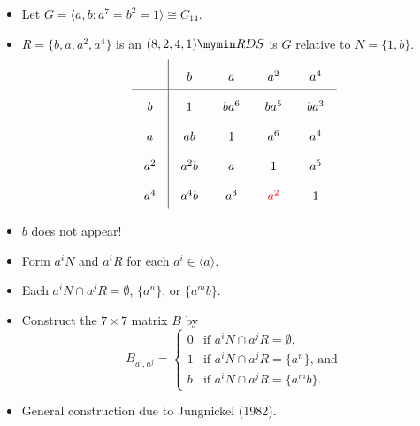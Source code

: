 \documentclass{beamer}
\newcommand{\rds}[1]{#1 \mymin RDS}
\newcommand{\RR}[1]{\textcolor{red}{#1}}
\begin{document}
\begin{frame}

  \begin{itemize}
  \item Let $G=\langle a,b : a^7=b^2=1 \rangle \cong C_{14}$.
  \item $R=\{b,a,a^2,a^4\}$ is an $\rds{(8,2,4,1)}$ is $G$ relative to $N=\{1,b\}$.
    \[
      \arraycolsep=10.0pt\def\arraystretch{2.0}
      \begin{array}{c|cccc}
        \text{ } & b & a & a^2 & a^4 \\ \hline
        b & 1 & ba^6 & ba^5 & ba^3 \\
        a & ab & 1 & a^6 & a^4 \\
        a^2 & a^2b & a & 1 & a^5 \\
        a^4 & a^4b & a^3 & \RR{ a^2 } & 1
      \end{array}
    \]
  \item $b$ does not appear!
  \end{itemize}

\end{frame}

\begin{frame}

  \begin{itemize}
  \item Form $a^iN$ and $a^iR$ for each $a^i \in \langle a \rangle$.
  \item Each $a^iN \cap a^jR = \emptyset$, $\{a^n\}$, or $\{a^mb\}$.
  \item Construct the $7 \times 7$ matrix $B$ by
    \[
      B_{a^i,a^j} = 
      \begin{cases}
        0 & \text{if $a^iN \cap a^jR=\emptyset$,} \\
        1  & \text{if $a^iN \cap a^jR=\{a^n\}$, and} \\
        b & \text{if $a^iN \cap a^jR=\{a^mb\}$.}
      \end{cases}
    \]
  \item General construction due to Jungnickel (1982).
  \end{itemize}

\end{frame}
\end{document}
